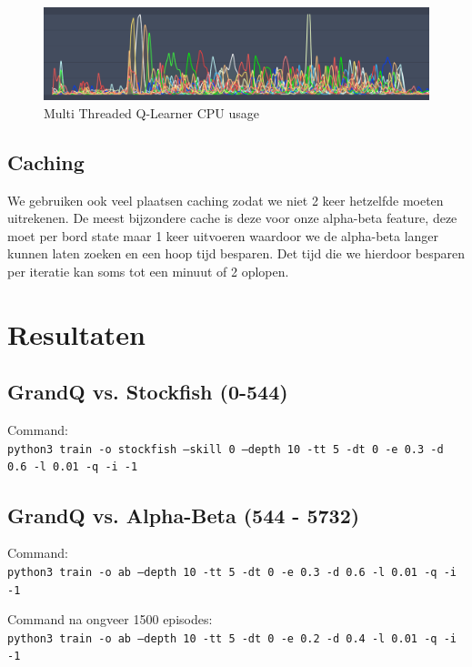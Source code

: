 \documentclass[a4paper,openany]{uantwerpenassignment}
\newcommand{\codeword}[1]{
    \colorbox{code}{\texttt{\textcolor{codetext}{#1}}}
}
\newcommand{\codeword}[1]{
    \colorbox{code}{\texttt{\textcolor{codetext}{#1}}}
}
\begin{document}
\begin{figure}[h]
    \centering
    \includegraphics[width=350pt]{images/multithreaded.png}
    \caption{Multi Threaded Q-Learner CPU usage}
    \label{fig:multithreaded}
\end{figure}

\section{Caching}

We gebruiken ook veel plaatsen caching zodat we niet 2 keer hetzelfde moeten uitrekenen. De meest bijzondere cache is deze voor onze alpha-beta feature, deze moet per bord state maar 1 keer uitvoeren waardoor we de alpha-beta langer kunnen laten zoeken en een hoop tijd besparen.
Det tijd die we hierdoor besparen per iteratie kan soms tot een minuut of 2 oplopen.

\chapter{Resultaten}
\section{GrandQ vs. Stockfish (0-544)}

Command:\\
\codeword{python3 train -o stockfish --skill 0 --depth 10 -tt 5 -dt 0 -e 0.3 -d 0.6 -l 0.01 -q -i -1}

\section{GrandQ vs. Alpha-Beta (544 - 5732)}

Command:\\
\codeword{python3 train -o ab --depth 10 -tt 5 -dt 0 -e 0.3 -d 0.6 -l 0.01 -q -i -1}

Command na ongveer 1500 episodes:\\
\codeword{python3 train -o ab --depth 10 -tt 5 -dt 0 -e 0.2 -d 0.4 -l 0.01 -q -i -1}



\end{document}
